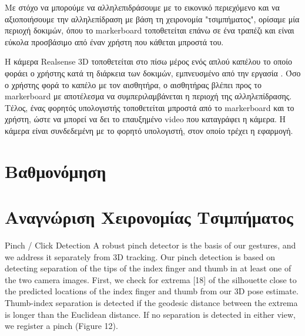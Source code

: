 Με στόχο να μπορούμε να αλληλεπιδράσουμε με το εικονικό περιεχόμενο και να αξιοποιήσουμε την αλληλεπίδραση με βάση τη χειρονομία "τσιμπήματος", ορίσαμε μία περιοχή δοκιμών, όπου το markerboard τοποθετείται επάνω σε ένα τραπέζι και είναι εύκολα προσβάσιμο από έναν χρήστη που κάθεται μπροστά του. 

Η κάμερα Realsense 3D τοποθετείται στο πίσω μέρος ενός απλού καπέλου το οποίο φοράει ο χρήστης κατά τη διάρκεια των δοκιμών, εμπνευσμένο από την εργασία \cite{Mathews2007}. Όσο ο χρήστης φορά το καπέλο με τον αισθητήρα, ο αισθητήρας βλέπει προς το markerboard με αποτέλεσμα να συμπεριλαμβάνεται η περιοχή της αλληλεπίδρασης. Τέλος, ένας φορητός υπολογιστής τοποθετείται μπροστά από το markerboard και το χρήστη, ώστε να μπορεί να δει το επαυξημένο video που καταγράφει η κάμερα. Η κάμερα είναι συνδεδεμένη με το φορητό υπολογιστή, στον οποίο τρέχει η εφαρμογή. 


\section{Βαθμονόμηση}




\section{Αναγνώριση Χειρονομίας Τσιμπήματος}

Pinch / Click Detection A robust pinch detector is the basis
of our gestures, and we address it separately from 3D tracking.
Our pinch detection is based on detecting separation of
the tips of the index finger and thumb in at least one of the
two camera images. First, we check for extrema [18] of the
silhouette close to the predicted locations of the index finger
and thumb from our 3D pose estimate. Thumb-index separation
is detected if the geodesic distance between the extrema
is longer than the Euclidean distance. If no separation is detected
in either view, we register a pinch (Figure 12).



